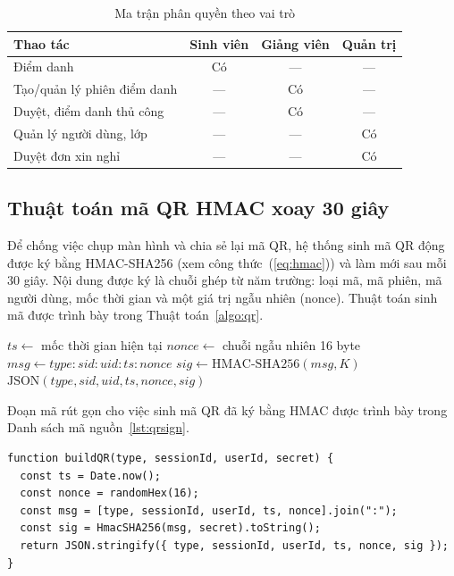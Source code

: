 \documentclass[../main.tex]{subfiles}
\begin{document}
\begin{table}[H]
\centering
\small
\caption{Ma trận phân quyền theo vai trò}
\label{tab:phanquyen}
\begin{tabular}{|p{5cm}|c|c|c|}
\hline
\textbf{Thao tác} & \textbf{Sinh viên} & \textbf{Giảng viên} & \textbf{Quản trị} \\
\hline
Điểm danh & Có & --- & --- \\ \hline
Tạo/quản lý phiên điểm danh & --- & Có & --- \\ \hline
Duyệt, điểm danh thủ công & --- & Có & --- \\ \hline
Quản lý người dùng, lớp & --- & --- & Có \\ \hline
Duyệt đơn xin nghỉ & --- & --- & Có \\ \hline
\end{tabular}
\end{table}

\subsection{Thuật toán mã QR HMAC xoay 30 giây}
\label{sec:hmac-rotating}

Để chống việc chụp màn hình và chia sẻ lại mã QR, hệ thống sinh mã QR động được ký bằng
HMAC-SHA256 (xem công thức~(\ref{eq:hmac})) và làm mới sau mỗi 30 giây. Nội dung được ký
là chuỗi ghép từ năm trường: loại mã, mã phiên, mã người dùng, mốc thời gian và một giá
trị ngẫu nhiên (nonce). Thuật toán sinh mã được trình bày trong Thuật toán~\ref{algo:qr}.

\begin{algorithm}[H]
\caption{Sinh mã QR động của giảng viên}
\label{algo:qr}
$ts \leftarrow$ mốc thời gian hiện tại\;
$nonce \leftarrow$ chuỗi ngẫu nhiên 16 byte\;
$msg \leftarrow type : sid : uid : ts : nonce$\;
$sig \leftarrow \text{HMAC-SHA256}(msg, K)$\;
\Return $\text{JSON}(type, sid, uid, ts, nonce, sig)$\;
\end{algorithm}

Đoạn mã rút gọn cho việc sinh mã QR đã ký bằng HMAC được trình bày trong
Danh sách mã nguồn~\ref{lst:qrsign}.

\begin{lstlisting}[caption={Sinh mã QR đã ký HMAC-SHA256},captionpos=b,label=lst:qrsign]
function buildQR(type, sessionId, userId, secret) {
  const ts = Date.now();
  const nonce = randomHex(16);
  const msg = [type, sessionId, userId, ts, nonce].join(":");
  const sig = HmacSHA256(msg, secret).toString();
  return JSON.stringify({ type, sessionId, userId, ts, nonce, sig });
}
\end{lstlisting}
\end{document}
